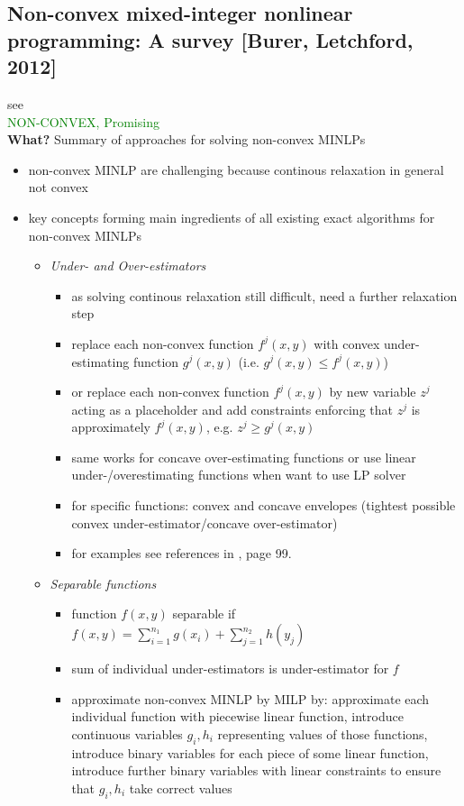 \documentclass{article}
\begin{document}
\subsection{Non-convex mixed-integer nonlinear programming: A survey [Burer, Letchford, 2012]}
see \cite{burer2012non}\\
\textcolor{green}{NON-CONVEX, Promising}\\
\textbf{What?} Summary of approaches for solving non-convex MINLPs
\begin{itemize}
\item non-convex MINLP are challenging because  continous relaxation in general not convex
\item key concepts forming main ingredients of all existing exact algorithms for non-convex MINLPs
	\begin{itemize}
	\item \emph{Under- and Over-estimators}
		\begin{itemize}
		\item as solving continous relaxation still difficult, need a further relaxation step
		\item replace each non-convex function $f^j(x,y)$ with convex under-estimating function $g^j(x,y)$ (i.e. $g^j(x,y) \leq f^j(x,y)$)
		\item or replace each non-convex function $f^j(x,y)$ by new variable $z^j$ acting as a placeholder and add constraints enforcing that $z^j$ is approximately  $f^j(x,y)$, e.g. $z^j \geq g^j(x,y)$
		\item same works for concave over-estimating functions or use linear under-/overestimating functions when want to use LP solver
		\item for specific functions: convex and concave envelopes (tightest possible convex under-estimator/concave over-estimator)
		\item for examples see references in \cite{burer2012non}, page 99.
		\end{itemize}
	\item \emph{Separable functions}
		\begin{itemize}
		\item function $f(x,y)$ separable if $f(x,y) = \sum_{i=1}^{n_1}g(x_i) + \sum_{j=1}^{n_2}h(y_j)$
		\item sum of individual under-estimators is under-estimator for $f$
		\item approximate non-convex MINLP by MILP by: approximate each individual function with piecewise linear function, introduce continuous variables $g_i, h_i$ representing values of those functions, introduce binary variables for each piece of some linear function, introduce further binary variables with linear constraints to ensure that $g_i, h_i$ take correct values

\end{itemize}
\end{itemize}
\end{itemize}
\end{document}
